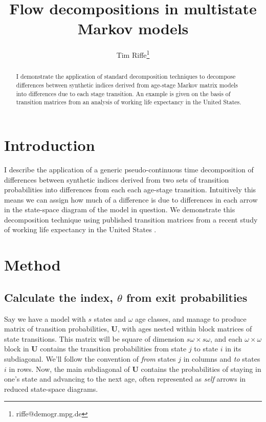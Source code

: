 \documentclass{article}
\begin{document}
\title{Flow decompositions in multistate Markov models}
\author[1]{Tim Riffe\thanks{riffe@demogr.mpg.de}}
\maketitle

\begin{abstract}
I demonstrate the application of standard decomposition techniques to decompose
differences between synthetic indices derived from age-stage Markov matrix
models into differences due to each stage transition. An example is given on the basis
of transition matrices from an analysis of working life expectancy in the
United States.
\end{abstract}

\section{Introduction}
I describe the application of a generic pseudo-continuous time decomposition
\citep{horiuchi2008} of differences between synthetic indices derived from two
sets of transition probabilities into differences from each each age-stage transition. Intuitively this means
we can assign how much of a difference is due to differences in each arrow in
the state-space diagram of the model in question. We demonstrate this
decomposition technique using published transition matrices from a recent study
of working life expectancy in the United States \citep{Dudel2017}.

\section{Method}
\subsection{Calculate the index, $\theta$ from exit probabilities}
Say we have a model with $s$ states and $\omega$ age classes, and manage to
produce matrix of transition probabilities, $\textbf{U}$, with ages nested
within block matrices of state transitions. This matrix will be square of
dimension $s\omega \times s\omega$, and each $\omega \times \omega$ block in
$\textbf{U}$ contains the transition probabilities from state $j$ to state $i$
in its subdiagonal. We'll follow the convention of \emph{from} states $j$ in
columns and \emph{to} states $i$ in rows. Now,
the main subdiagonal of $\textbf{U}$ contains the probabilities of staying in
one's state and advancing to the next age, often represented as
\emph{self} arrows in reduced state-space diagrams. 
\end{document}
